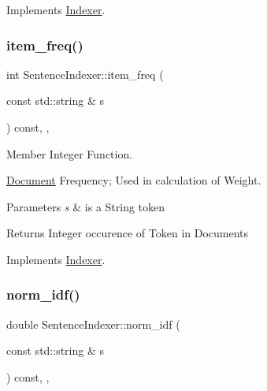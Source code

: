 Implements \hyperlink{class_indexer_a52bcf307b7fea4f3c6e7b440bc60d2fe}{Indexer}.

\mbox{\label{class_sentence_indexer_a892b5cc701450698a04de74a3661928e}} 
\subsubsection{\texorpdfstring{item\+\_\+freq()}{item\_freq()}}
{\footnotesize\ttfamily int Sentence\+Indexer\+::item\+\_\+freq (\begin{DoxyParamCaption}\item[{const std\+::string \&}]{s }\end{DoxyParamCaption}) const\hspace{0.3cm}{\ttfamily [override]}, {\ttfamily [private]}, {\ttfamily [virtual]}}



Member Integer Function. 

\hyperlink{class_document}{Document} Frequency; Used in calculation of Weight.


\begin{DoxyParams}{Parameters}
{\em s} & is a String token \\
\hline
\end{DoxyParams}
\begin{DoxyReturn}{Returns}
Integer occurence of Token in Documents 
\end{DoxyReturn}


Implements \hyperlink{class_indexer_a9f9ea4d9946c531f257720cc9e9391eb}{Indexer}.

\mbox{\label{class_sentence_indexer_a646014181566f20140cee5dbd16f52fa}} 
\subsubsection{\texorpdfstring{norm\+\_\+idf()}{norm\_idf()}}
{\footnotesize\ttfamily double Sentence\+Indexer\+::norm\+\_\+idf (\begin{DoxyParamCaption}\item[{const std\+::string \&}]{s }\end{DoxyParamCaption}) const\hspace{0.3cm}{\ttfamily [override]}, {\ttfamily [private]}, {\ttfamily [virtual]}}



